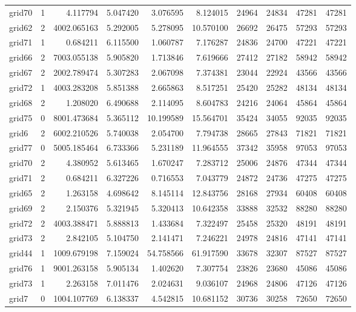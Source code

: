 \begin{longtable}{|l|r|r|r|r|r|r|r|r|r|}
grid70 & 1 & 4.117794 & 5.047420 & 3.076595 & 8.124015 & 24964 & 24834 & 47281 & 47281 \\
grid62 & 2 & 4002.065163 & 5.292005 & 5.278095 & 10.570100 & 26692 & 26475 & 57293 & 57293 \\
grid71 & 1 & 0.684211 & 6.115500 & 1.060787 & 7.176287 & 24836 & 24700 & 47221 & 47221 \\
grid66 & 2 & 7003.055138 & 5.905820 & 1.713846 & 7.619666 & 27412 & 27182 & 58942 & 58942 \\
grid67 & 2 & 2002.789474 & 5.307283 & 2.067098 & 7.374381 & 23044 & 22924 & 43566 & 43566 \\
grid72 & 1 & 4003.283208 & 5.851388 & 2.665863 & 8.517251 & 25420 & 25282 & 48134 & 48134 \\
grid68 & 2 & 1.208020 & 6.490688 & 2.114095 & 8.604783 & 24216 & 24064 & 45864 & 45864 \\
grid75 & 0 & 8001.473684 & 5.365112 & 10.199589 & 15.564701 & 35424 & 34055 & 92035 & 92035 \\
grid6 & 2 & 6002.210526 & 5.740038 & 2.054700 & 7.794738 & 28665 & 27843 & 71821 & 71821 \\
grid77 & 0 & 5005.185464 & 6.733366 & 5.231189 & 11.964555 & 37342 & 35958 & 97053 & 97053 \\
grid70 & 2 & 4.380952 & 5.613465 & 1.670247 & 7.283712 & 25006 & 24876 & 47344 & 47344 \\
grid71 & 2 & 0.684211 & 6.327226 & 0.716553 & 7.043779 & 24872 & 24736 & 47275 & 47275 \\
grid65 & 2 & 1.263158 & 4.698642 & 8.145114 & 12.843756 & 28168 & 27934 & 60408 & 60408 \\
grid69 & 2 & 2.150376 & 5.321945 & 5.320413 & 10.642358 & 33888 & 32532 & 88280 & 88280 \\
grid72 & 2 & 4003.388471 & 5.888813 & 1.433684 & 7.322497 & 25458 & 25320 & 48191 & 48191 \\
grid73 & 2 & 2.842105 & 5.104750 & 2.141471 & 7.246221 & 24978 & 24816 & 47141 & 47141 \\
grid44 & 1 & 1009.679198 & 7.159024 & 54.758566 & 61.917590 & 33678 & 32307 & 87527 & 87527 \\
grid76 & 1 & 9001.263158 & 5.905134 & 1.402620 & 7.307754 & 23826 & 23680 & 45086 & 45086 \\
grid73 & 1 & 2.263158 & 7.011476 & 2.024631 & 9.036107 & 24968 & 24806 & 47126 & 47126 \\
grid7 & 0 & 1004.107769 & 6.138337 & 4.542815 & 10.681152 & 30736 & 30258 & 72650 & 72650 \\

\end{longtable}

